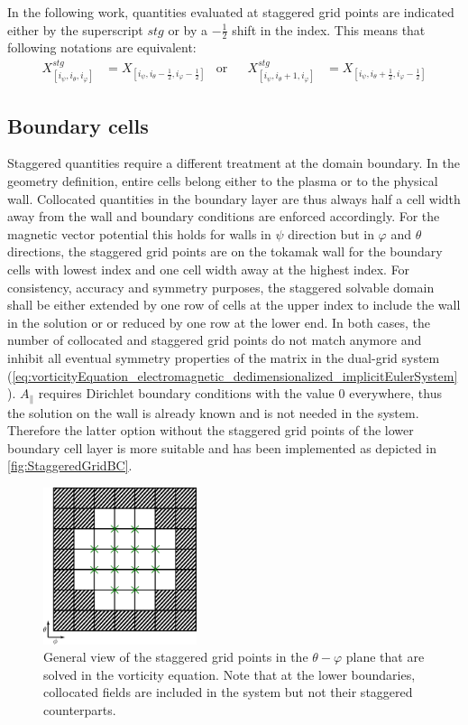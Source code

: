 In the following work, quantities evaluated at staggered grid points are indicated either by the superscript $stg$ or by a $-\frac{1}{2}$ shift in the index. This means that following notations are equivalent: 
\begin{align*}
	X^{stg}_{[i_\psi,i_\theta,i_\varphi]} &= X_{[i_\psi,i_\theta-\frac{1}{2},i_\varphi-\frac{1}{2}]} &\text{or}&& X^{stg}_{[i_\psi,i_\theta+1,i_\varphi]} &= X_{[i_\psi,i_\theta+\frac{1}{2},i_\varphi-\frac{1}{2}]}
\end{align*}

\subsection{Boundary cells}

Staggered quantities require a different treatment at the domain boundary. In the geometry definition, entire cells belong either to the plasma or to the physical wall. Collocated quantities in the boundary layer are thus always half a cell width away from the wall and boundary conditions are enforced accordingly. For the magnetic vector potential this holds for walls in $\psi$ direction but in $\varphi$ and $\theta$ directions, the staggered grid points are on the tokamak wall for the boundary cells with lowest index and one cell width away at the highest index. For consistency, accuracy and symmetry purposes, the staggered solvable domain shall be either extended by one row of cells at the upper index to include the wall in the solution or or reduced by one row at the lower end. In both cases, the number of collocated and staggered grid points do not match anymore and inhibit all eventual symmetry properties of the matrix in the dual-grid system (\ref{eq:vorticityEquation_electromagnetic_dedimensionalized_implicitEulerSystem}). $A_\parallel$ requires Dirichlet boundary conditions with the value 0 everywhere, thus the solution on the wall is already known and is not needed in the system. Therefore the latter option without the staggered grid points of the lower boundary cell layer is more suitable and has been implemented as depicted in \autoref{fig:StaggeredGridBC}.
\begin{figure}[H]
	\centering
	\includegraphics[width=0.4\textwidth]{schemes/staggeredGridBoundary.pdf}
	\caption{General view of the staggered grid points in the $\theta-\varphi$ plane that are solved in the vorticity equation. Note that at the lower boundaries, collocated fields are included in the system but not their staggered counterparts. }
	\label{fig:StaggeredGridBC}
\end{figure}
